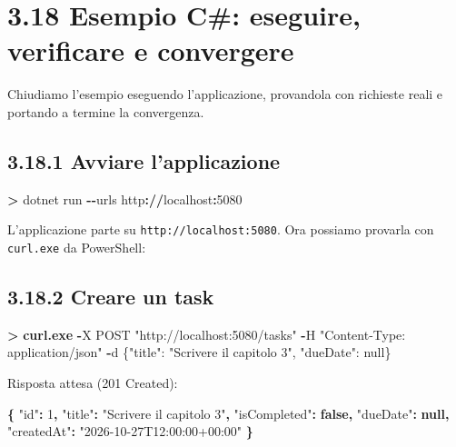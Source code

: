 \documentclass[
  italian,
  10pt,
]{book}
\newenvironment{Shaded}{\begin{snugshade}}{\end{snugshade}}
\newcommand{\DataTypeTok}[1]{\textcolor[rgb]{0.13,0.29,0.53}{#1}}
\newcommand{\DecValTok}[1]{\textcolor[rgb]{0.00,0.00,0.81}{#1}}
\newcommand{\FunctionTok}[1]{\textcolor[rgb]{0.13,0.29,0.53}{\textbf{#1}}}
\newcommand{\KeywordTok}[1]{\textcolor[rgb]{0.13,0.29,0.53}{\textbf{#1}}}
\newcommand{\NormalTok}[1]{#1}
\newcommand{\OperatorTok}[1]{\textcolor[rgb]{0.81,0.36,0.00}{\textbf{#1}}}
\newcommand{\StringTok}[1]{\textcolor[rgb]{0.31,0.60,0.02}{#1}}
\begin{document}
\section{3.18 Esempio C\#: eseguire, verificare e
convergere}\label{esempio-c-eseguire-verificare-e-convergere}

Chiudiamo l'esempio eseguendo l'applicazione, provandola con richieste
reali e portando a termine la convergenza.

\subsection{3.18.1 Avviare l'applicazione}\label{avviare-lapplicazione}

\begin{Shaded}
\begin{Highlighting}[]
\OperatorTok{\textgreater{}}\NormalTok{ dotnet run }\OperatorTok{{-}{-}}\NormalTok{urls http}\OperatorTok{://}\NormalTok{localhost}\OperatorTok{:}\DecValTok{5080}
\end{Highlighting}
\end{Shaded}

L'applicazione parte su \texttt{http://localhost:5080}. Ora possiamo
provarla con \texttt{curl.exe} da PowerShell:

\subsection{3.18.2 Creare un task}\label{creare-un-task}

\begin{Shaded}
\begin{Highlighting}[]
\OperatorTok{\textgreater{}} \FunctionTok{curl}\OperatorTok{.}\FunctionTok{exe} \OperatorTok{{-}}\NormalTok{X POST }\StringTok{"http://localhost:5080/tasks"}\NormalTok{ \textasciigrave{}}
    \OperatorTok{{-}}\NormalTok{H }\StringTok{"Content{-}Type: application/json"}\NormalTok{ \textasciigrave{}}
    \OperatorTok{{-}}\NormalTok{d }\StringTok{\textquotesingle{}\{"title": "Scrivere il capitolo 3", "dueDate": null\}\textquotesingle{}}
\end{Highlighting}
\end{Shaded}

Risposta attesa (201 Created):

\begin{Shaded}
\begin{Highlighting}[]
\FunctionTok{\{}
  \DataTypeTok{"id"}\FunctionTok{:} \DecValTok{1}\FunctionTok{,}
  \DataTypeTok{"title"}\FunctionTok{:} \StringTok{"Scrivere il capitolo 3"}\FunctionTok{,}
  \DataTypeTok{"isCompleted"}\FunctionTok{:} \KeywordTok{false}\FunctionTok{,}
  \DataTypeTok{"dueDate"}\FunctionTok{:} \KeywordTok{null}\FunctionTok{,}
  \DataTypeTok{"createdAt"}\FunctionTok{:} \StringTok{"2026{-}10{-}27T12:00:00+00:00"}
\FunctionTok{\}}
\end{Highlighting}
\end{Shaded}
\end{document}
